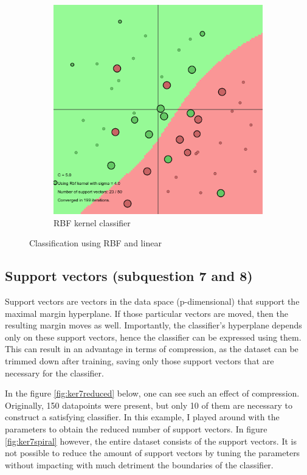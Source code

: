 \documentclass[11pt, a4paper]{article}
\begin{document}
\begin{figure}[H]
\begin{subfigure}{.5\textwidth}
      \includegraphics[width=0.9\linewidth]{1-2-1-kernel6n.png}
      \caption{RBF kernel classifier}
      \label{fig:rbf_class}
    \end{subfigure}
    \caption{Classification using RBF and linear}
    \label{fig:rbf_lin_data}
\end{figure}

\subsection{Support vectors (subquestion 7 and 8)}

Support vectors are vectors in the data space (p-dimensional) that
support the maximal margin hyperplane. If those particular vectors are
moved, then the resulting margin moves as well. Importantly, the
classifier's hyperplane depends only on these support vectors, hence
the classifier can be expressed using them. This can result in an
advantage in terms of compression, as the dataset can be trimmed down
after training, saving only those support vectors that are necessary
for the classifier.

In the figure \ref{fig:ker7reduced} below, one can see such an effect
of compression. Originally, 150 datapoints were present, but only 10
of them are necessary to construct a satisfying classifier. In this
example, I played around with the parameters to obtain the reduced
number of support vectors. In figure \ref{fig:ker7spiral} however, the
entire dataset consists of the support vectors. It is not possible to
reduce the amount of support vectors by tuning the parameters without
impacting with much detriment the boundaries of the classifier.
\end{document}
